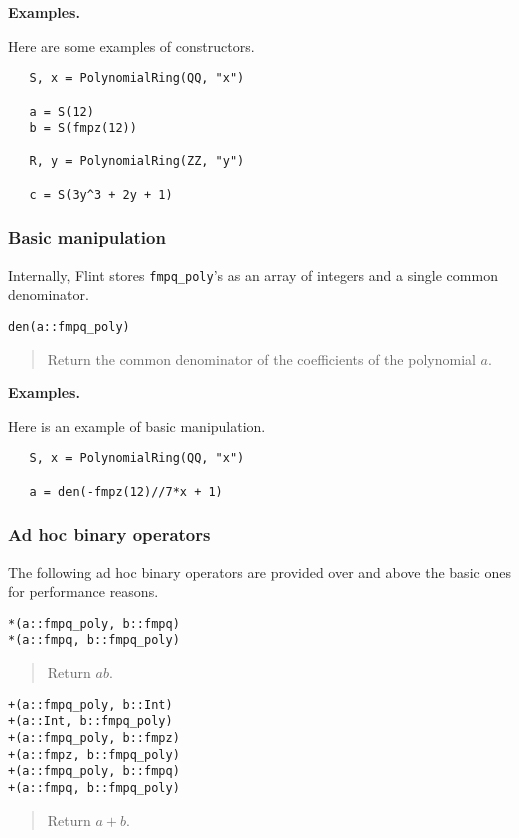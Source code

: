 \documentclass[a4paper,10pt]{article}
\newcommand{\code}{\lstinline}
\newcommand{\desc}[1]{\vspace{-3mm}\begin{quote}#1\end{quote}}
\begin{document}
{{\textbf{Examples.}

Here are some examples of constructors.

\begin{lstlisting}
   S, x = PolynomialRing(QQ, "x")

   a = S(12)
   b = S(fmpz(12))
   
   R, y = PolynomialRing(ZZ, "y")

   c = S(3y^3 + 2y + 1)
\end{lstlisting}

\subsubsection{Basic manipulation}

Internally, Flint stores \code{fmpq_poly}'s as an array of integers and a single
common denominator.

\begin{lstlisting}
den(a::fmpq_poly)
\end{lstlisting}

\desc{Return the common denominator of the coefficients of the polynomial $a$.}

\textbf{Examples.}

Here is an example of basic manipulation.

\begin{lstlisting}
   S, x = PolynomialRing(QQ, "x")

   a = den(-fmpz(12)//7*x + 1)
\end{lstlisting}

\subsubsection{Ad hoc binary operators}

The following ad hoc binary operators are provided over and above the basic ones
for performance reasons.

\begin{lstlisting}
*(a::fmpq_poly, b::fmpq)
*(a::fmpq, b::fmpq_poly)
\end{lstlisting}

\desc{Return $ab$.}

\begin{lstlisting}
+(a::fmpq_poly, b::Int)
+(a::Int, b::fmpq_poly)
+(a::fmpq_poly, b::fmpz)
+(a::fmpz, b::fmpq_poly)
+(a::fmpq_poly, b::fmpq)
+(a::fmpq, b::fmpq_poly)
\end{lstlisting}

\desc{Return $a + b$.}

}}
\end{document}
